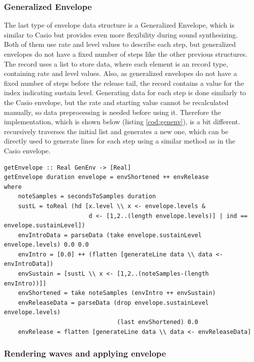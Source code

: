 \documentclass[runningheads]{llncs}
\begin{document}
\subsubsection{Generalized Envelope}

The last type of envelope data structure is a Generalized Envelope, which is similar to Casio but provides even more flexibility during sound synthesizing. Both of them use rate and level values to describe each step, but generalized envelopes do not have a fixed number of steps like the other previous structures. The  record uses a list to store data, where each element is an  record type, containing rate and level values. Also, as generalized envelopes do not have a fixed number of steps before the release tail, the  record contains a value for the index indicating sustain level. Generating data for each step is done similarly to the Casio envelope, but the rate and starting value cannot be recalculated manually, so data preprocessing is needed before using it. Therefore the implementation, which is shown below (listing \ref{cod:genenv}), is a bit different.  recursively traverses the initial list and generates a new one, which can be directly used to generate lines for each step using a similar method as in the Casio envelope.

\begin{lstlisting}[language=Clean,label={cod:genenv},caption={Generalized envelope generating function}, captionpos=b]
getEnvelope :: Real GenEnv -> [Real]
getEnvelope duration envelope = envShortened ++ envRelease 
where
    noteSamples = secondsToSamples duration
    sustL = toReal (hd [x.level \\ x <- envelope.levels &
                        d <- [1,2..(length envelope.levels)] | ind == envelope.sustainLevel])
    envIntroData = parseData (take envelope.sustainLevel envelope.levels) 0.0 0.0
    envIntro = [0.0] ++ (flatten [generateLine data \\ data <- envIntroData])
    envSustain = [sustL \\ x <- [1,2..(noteSamples-(length envIntro))]]
    envShortened = take noteSamples (envIntro ++ envSustain)
    envReleaseData = parseData (drop envelope.sustainLevel envelope.levels) 
                                (last envShortened) 0.0
    envRelease = flatten [generateLine data \\ data <- envReleaseData]
\end{lstlisting}

\subsubsection{Rendering waves and applying envelope} \label{rendering}
\end{document}
